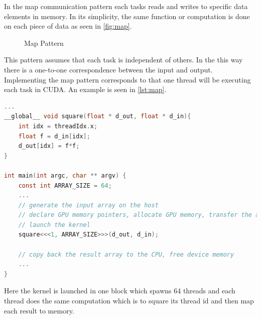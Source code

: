 In the map communication pattern each tasks reads and writes to specific data elements in memory.
In its simplicity, the same function or computation is done on each piece of data as seen in \autoref{fig:map}.

\begin{figure}[ht]
	\centering
	\caption{Map Pattern}
	\label{fig:map}
\end{figure}
This pattern assumes that each task is independent of others.
In the this way there is a one-to-one correspondence between the input and output.
Implementing the map pattern corresponds to that one thread will be executing each task in CUDA.
An example is seen in \autoref{lst:map}.

\begin{lstlisting}[language=C,caption={Squaring thread id using map pattern},label=lst:map]
...
__global__ void square(float * d_out, float * d_in){
	int idx = threadIdx.x;
	float f = d_in[idx];
	d_out[idx] = f*f; 	
}

int main(int argc, char ** argv) {
	const int ARRAY_SIZE = 64;
	...
	// generate the input array on the host
	// declare GPU memory pointers, allocate GPU memory, transfer the array to the GPU
	// launch the kernel
	square<<<1, ARRAY_SIZE>>>(d_out, d_in);

	// copy back the result array to the CPU, free device memory
	...
}
\end{lstlisting}


Here the kernel is launched in one block which spawns 64 threads and each thread does the same computation which is to square its thread id and then map each result to memory.